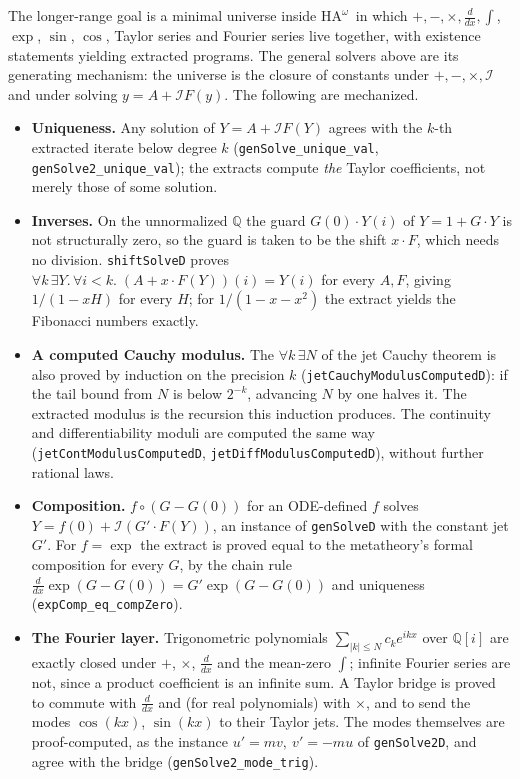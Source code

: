 \documentclass[11pt,a4paper]{article}
\theoremstyle{definition}
\theoremstyle{remark}
\newcommand{\HAomega}{\ensuremath{\mathrm{HA}^{\omega}}}
\newcommand{\lean}[1]{\texttt{\nolinkurl{#1}}}
\begin{document}
The longer-range goal is a minimal universe inside \HAomega\ in which
\(+, -, \times, \frac{d}{dx}, \int\), \(\exp\), \(\sin\), \(\cos\), Taylor
series and Fourier series live together, with existence statements yielding
extracted programs. The general solvers above are its generating mechanism:
the universe is the closure of constants under \(+,-,\times,\mathcal{I}\) and
under solving \(y = A + \mathcal{I}F(y)\). The following are mechanized.
\begin{itemize}
\item \textbf{Uniqueness.} Any solution of \(Y = A + \mathcal{I}F(Y)\) agrees
with the \(k\)-th extracted iterate below degree \(k\)
(\lean{genSolve_unique_val}, \lean{genSolve2_unique_val}); the extracts compute
\emph{the} Taylor coefficients, not merely those of some solution.
\item \textbf{Inverses.} On the unnormalized \(\mathbb{Q}\) the guard
\(G(0)\cdot Y(i)\) of \(Y = 1 + G\cdot Y\) is not structurally zero, so the guard
is taken to be the shift \(x\cdot F\), which needs no division.
\lean{shiftSolveD} proves \(\forall k\,\exists Y.\,\forall i<k.\;
(A + x\cdot F(Y))(i) = Y(i)\) for every \(A, F\), giving \(1/(1 - xH)\) for every
\(H\); for \(1/(1 - x - x^2)\) the extract yields the Fibonacci numbers exactly.
\item \textbf{A computed Cauchy modulus.} The \(\forall k\,\exists N\) of
the jet Cauchy theorem is also proved by induction on the precision \(k\)
(\lean{jetCauchyModulusComputedD}): if the tail bound from \(N\) is below
\(2^{-k}\), advancing \(N\) by one halves it. The extracted modulus is the
recursion this induction produces. The continuity and differentiability
moduli are computed the same way (\lean{jetContModulusComputedD},
\lean{jetDiffModulusComputedD}), without further rational laws.
\item \textbf{Composition.} \(f\circ(G - G(0))\) for an ODE-defined \(f\) solves
\(Y = f(0) + \mathcal{I}(G'\cdot F(Y))\), an instance of \lean{genSolveD} with the
constant jet \(G'\). For \(f = \exp\) the extract is proved equal to the
metatheory's formal composition for every \(G\), by the chain rule
\(\frac{d}{dx}\exp(G - G(0)) = G'\exp(G - G(0))\) and uniqueness
(\lean{expComp_eq_compZero}).
\item \textbf{The Fourier layer.} Trigonometric polynomials
\(\sum_{|k|\le N} c_k e^{ikx}\) over \(\mathbb{Q}[i]\) are exactly closed under
\(+\), \(\times\), \(\frac{d}{dx}\) and the mean-zero \(\int\); infinite Fourier
series are not, since a product coefficient is an infinite sum. A Taylor bridge
is proved to commute with \(\frac{d}{dx}\) and (for real polynomials) with
\(\times\), and to send the modes \(\cos(kx)\), \(\sin(kx)\) to their Taylor
jets. The modes themselves are proof-computed, as the instance
\(u' = m v,\ v' = -m u\) of \lean{genSolve2D}, and agree with the bridge
(\lean{genSolve2_mode_trig}).


\end{itemize}
\end{document}
